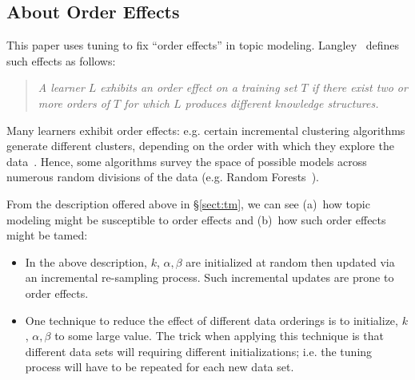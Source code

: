 \documentclass[10pt,conference]{IEEEtran}
\newcommand{\bi}{\begin{itemize}}
\newcommand{\ei}{\end{itemize}}
\theoremstyle{break}
\begin{document}
\subsection{About Order Effects}

\noindent
This paper uses tuning to fix ``order effects'' in topic modeling. Langley~\cite{GENNARI198911} defines such effects as follows:
\begin{quote}
{\em A learner $L$ exhibits an order effect on a training set  $T$ if there exist
two or more orders of $T$ for which $L$ produces different knowledge structures.}
\end{quote}
Many learners exhibit order effects: e.g. certain incremental clustering algorithms generate different
clusters, depending on the order with which they explore the data~\cite{GENNARI198911}.
Hence, some algorithms survey the space of possible models across numerous
random divisions of the data (e.g. Random Forests~\cite{Breiman2001}).

From the description offered above in \S\ref{sect:tm},
we can see (a)~how topic modeling might be susceptible to order effects and (b)~how such order
effects might be tamed:
\bi
\item
  In the above description, $k$, $\alpha,\beta$ are initialized at random
then updated via an incremental re-sampling process. Such incremental updates are prone to order effects.
\item
  One technique to reduce the effect of different data orderings is to initialize, $k$, $\alpha,\beta$ to some
  large value. The trick when applying this technique is that different data sets will requiring different
  initializations; i.e. the tuning process will have to be repeated for each new data set.
\ei
  





\end{document}
